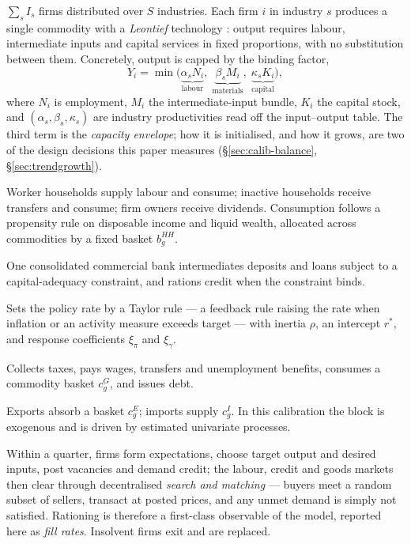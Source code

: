 \documentclass[11pt,a4paper]{article}
\begin{document}
\begin{description}[leftmargin=1.6em,style=nextline,itemsep=3pt]
\item[Firms.] $\sum_s I_s$ firms distributed over $S$ industries. Each firm $i$ in industry $s$
  produces a single commodity with a \emph{Leontief} technology \citep{leontief1936}: output
  requires labour, intermediate inputs and capital services in fixed proportions, with no
  substitution between them. Concretely, output is capped by the binding factor,
  \begin{equation}
    Y_i = \min\!\Big( \underbrace{\alpha_s N_i}_{\text{labour}},\;
                      \underbrace{\beta_s M_i}_{\text{materials}},\;
                      \underbrace{\kappa_s K_i}_{\text{capital}} \Big),
    \label{eq:leontief}
  \end{equation}
  where $N_i$ is employment, $M_i$ the intermediate-input bundle, $K_i$ the capital stock, and
  $(\alpha_s,\beta_s,\kappa_s)$ are industry productivities read off the input--output table. The
  third term is the \emph{capacity envelope}; how it is initialised, and how it grows, are two of
  the design decisions this paper measures (\S\ref{sec:calib-balance}, \S\ref{sec:trendgrowth}).
\item[Households.] Worker households supply labour and consume; inactive households receive
  transfers and consume; firm owners receive dividends. Consumption follows a propensity rule on
  disposable income and liquid wealth, allocated across commodities by a fixed basket $b^{HH}_g$.
\item[A bank.] One consolidated commercial bank intermediates deposits and loans subject to a
  capital-adequacy constraint, and rations credit when the constraint binds.
\item[A central bank.] Sets the policy rate by a Taylor rule --- a feedback rule raising the rate
  when inflation or an activity measure exceeds target --- with inertia $\rho$, an intercept
  $r^{*}$, and response coefficients $\xi_\pi$ and $\xi_\gamma$.
\item[A government.] Collects taxes, pays wages, transfers and unemployment benefits, consumes a
  commodity basket $c^{G}_g$, and issues debt.
\item[A rest-of-world block.] Exports absorb a basket $c^{E}_g$; imports supply $c^{I}_g$. In this
  calibration the block is exogenous and is driven by estimated univariate processes.
\end{description}

Within a quarter, firms form expectations, choose target output and desired inputs, post vacancies
and demand credit; the labour, credit and goods markets then clear through decentralised
\emph{search and matching} --- buyers meet a random subset of sellers, transact at posted prices,
and any unmet demand is simply not satisfied. Rationing is therefore a first-class observable of
the model, reported here as \emph{fill rates}. Insolvent firms exit and are replaced.
\end{document}
